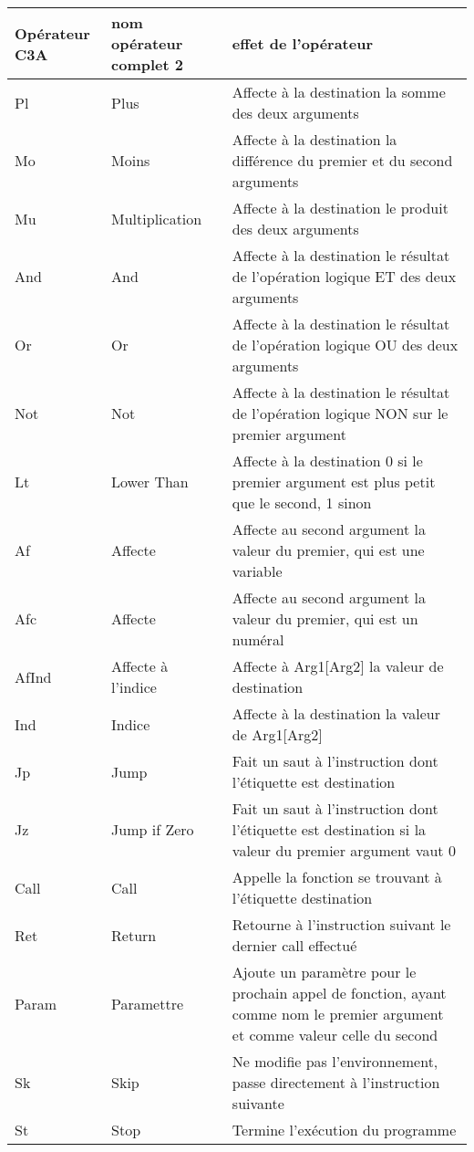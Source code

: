\documentclass{article}
\begin{document}
\begin{tabular}{|p{1.5cm}|p{2cm}|p{7cm}|}
  \hline
  Opérateur C3A & nom opérateur complet 2 & effet de l'opérateur \\
  \hline
  \hline
  Pl & Plus & Affecte à la destination la somme des deux arguments \\  \hline
  Mo & Moins & Affecte à la destination la différence du premier et du second arguments \\  \hline
  Mu & Multiplication & Affecte à la destination le produit des deux arguments \\  \hline
  And & And & Affecte à la destination le résultat de l'opération logique ET des deux arguments \\  \hline
  Or & Or & Affecte à la destination le résultat de l'opération logique OU des deux arguments \\  \hline
  Not & Not & Affecte à la destination le résultat de l'opération logique NON sur le premier argument \\  \hline
  Lt & Lower Than & Affecte à la destination 0 si le premier argument est plus petit que le second, 1 sinon\\  \hline
  Af & Affecte & Affecte au second argument la valeur du premier, qui est une variable\\  \hline
  Afc & Affecte & Affecte au second argument la valeur du premier, qui est un numéral\\  \hline
  AfInd & Affecte à l'indice & Affecte à Arg1[Arg2] la valeur de destination\\  \hline
  Ind & Indice & Affecte à la destination la valeur de Arg1[Arg2]\\  \hline
  Jp & Jump & Fait un saut à l'instruction dont l’étiquette est destination\\  \hline
  Jz & Jump if Zero & Fait un saut à l'instruction dont l’étiquette est destination si la valeur du premier argument vaut 0\\  \hline
  Call & Call & Appelle la fonction se trouvant à l'étiquette destination\\  \hline
  Ret & Return & Retourne à l'instruction suivant le dernier call effectué\\  \hline
  Param & Paramettre & Ajoute un paramètre pour le prochain appel de fonction, ayant comme nom le premier argument et comme valeur celle du second\\  \hline
  Sk & Skip & Ne modifie pas l'environnement, passe directement à l'instruction suivante\\  \hline
  St & Stop & Termine l'exécution du programme\\  \hline
\end{tabular}
\end{document}
